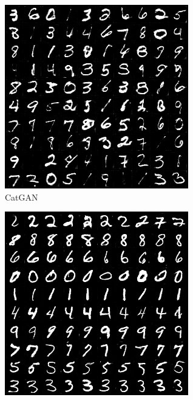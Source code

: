 \begin{figure}[htbp]
  \centering
  \begin{subfigure}[b]{\trif\textwidth}
    \includegraphics[width=\textwidth]{Img/cg-new.png}
    \caption{CatGAN}
    \label{ffig:m-cg}
  \end{subfigure}
  \begin{subfigure}[b]{\trif\textwidth}
    \includegraphics[width=\textwidth]{Img/icg-new.png}

\end{subfigure}
\end{figure}
